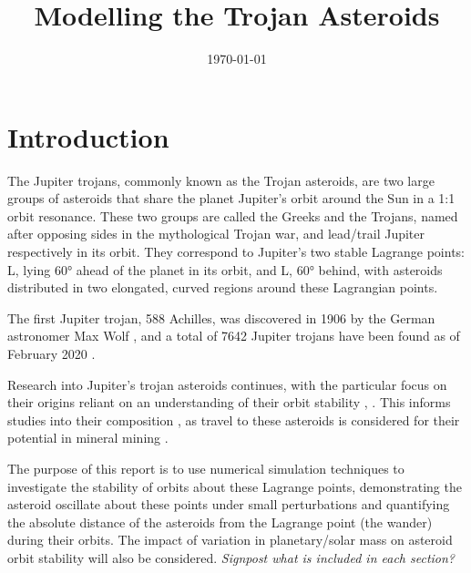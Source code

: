 \documentclass[11pt, a4paper,twocolumn]{article} %
\title{Modelling the Trojan Asteroids}
\author{\authorstyle{Christopher Gallagher} %
	\institution{University of Cambridge}}
\date{\today} %
\begin{document}
\maketitle %

\thispagestyle{firstpage} %




\section{Introduction}
The Jupiter trojans, commonly known as the Trojan asteroids, are two large groups of asteroids that share the planet Jupiter's orbit around the Sun in a 1:1 orbit resonance. These two groups are called the Greeks and the Trojans, named after opposing sides in the mythological Trojan war, and lead/trail Jupiter respectively in its orbit. They correspond to Jupiter's two stable Lagrange points: L, lying 60° ahead of the planet in its orbit, and L, 60° behind, with asteroids distributed in two elongated, curved regions around these Lagrangian points. 

The first Jupiter trojan, 588 Achilles, was discovered in 1906 by the German astronomer Max Wolf \cite{Nicholson1961}, and a total of 7642 Jupiter trojans have been found as of February 2020 \cite{IAU2020}.

Research into Jupiter's trojan asteroids continues, with the particular focus on their origins reliant on an understanding of their orbit stability \cite{DiSisto2019}, \cite{Nesvorn2018}. This informs studies into their composition \cite{Brown2016}, as travel to these asteroids is considered for their potential in mineral mining \cite{Okada2017} \cite{Levison2016}. 

The purpose of this report is to use numerical simulation techniques to investigate the stability of orbits about these Lagrange points, demonstrating the asteroid oscillate about these points under small perturbations and quantifying the absolute distance of the asteroids from the Lagrange point (the wander) during their orbits. The impact of variation in planetary/solar mass on asteroid orbit stability will also be considered. \textit{Signpost what is included in each section?}
\end{document}
